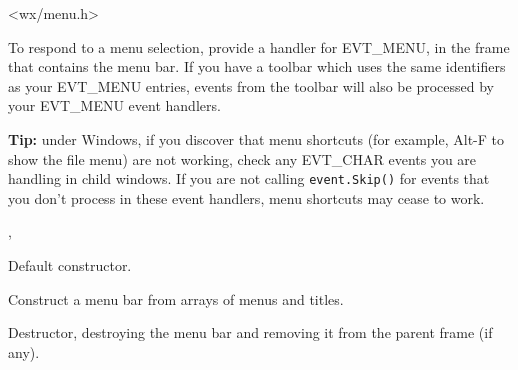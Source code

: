 
<wx/menu.h>


To respond to a menu selection, provide a handler for EVT\_MENU, in the frame
that contains the menu bar. If you have a toolbar which uses the same identifiers
as your EVT\_MENU entries, events from the toolbar will also be processed by your
EVT\_MENU event handlers.

{\bf Tip:} under Windows, if you discover that menu shortcuts (for example, Alt-F to show the file menu)
are not working, check any EVT\_CHAR events you are handling in child windows.
If you are not calling {\tt event.Skip()} for events that you don't process in these event handlers,
menu shortcuts may cease to work.


, 


\label{wxmenubarconstr}


Default constructor.


Construct a menu bar from arrays of menus and titles.










Destructor, destroying the menu bar and removing it from the parent frame (if any).

